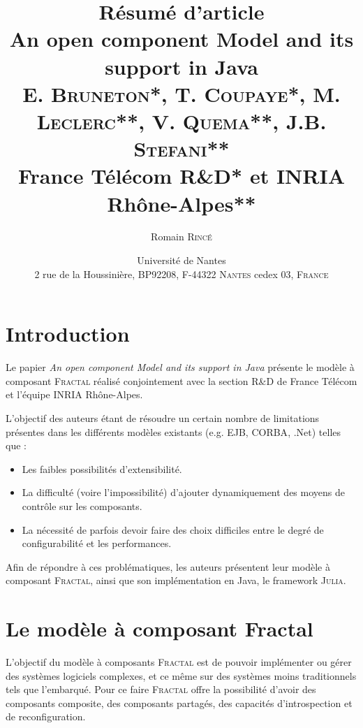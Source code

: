 \documentclass[12pt,a4paper,utf8x]{report}
\title{{\Huge Résumé d'article}\\\vspace{1cm}An open component Model and its support in Java\\\vspace{0.3cm}
\small E. \textsc{Bruneton}*, T. \textsc{Coupaye}*, M. \textsc{Leclerc}**, V. \textsc{Quema}**, J.B. \textsc{Stefani}**\\
France Télécom R\&D* et \textsc{INRIA} Rhône-Alpes**}
\author{Romain \textsc{Rincé}}
\date{Université de Nantes \\ 2 rue de la Houssinière, BP92208, F-44322 \textsc{Nantes} cedex 03, \textsc{France}}
\newcommand{\versalitas}[1]{{\usefont{T1}{cmr}{bx}{sc}#1}}%
\newcommand\fractal{\textsc{Fractal}}
\newcommand\julia{\textsc{Julia}}
\begin{document}
\maketitle
\renewcommand{\labelitemi}{$\bullet$} 

\clearpage

\clearpage

\section{Introduction}
Le papier \og \emph{An open component Model and its support in Java}\fg{} présente le modèle à composant \fractal{} réalisé conjointement avec la section R\&D de France Télécom et l'équipe \textsc{INRIA} Rhône-Alpes. 

L'objectif des auteurs étant de résoudre un certain nombre de limitations présentes dans les différents modèles existants (e.g. \textsc{EJB}, \textsc{CORBA}, .Net) telles que :
\begin{itemize}
 \item Les faibles possibilités d'extensibilité.
 \item La difficulté (voire l'impossibilité) d'ajouter dynamiquement des moyens de contrôle sur les composants.
 \item La nécessité de parfois devoir faire des choix difficiles entre le degré de configurabilité et les performances. 
\end{itemize}
Afin de répondre à ces problématiques, les auteurs présentent leur modèle à composant \fractal, ainsi que son implémentation en Java, le framework \julia.




\section{Le modèle à composant \versalitas{Fractal}}
L'objectif du modèle à composants \fractal{} est de pouvoir implémenter ou gérer des systèmes logiciels complexes, et ce même sur des systèmes moins traditionnels tels que l'embarqué. Pour ce faire \fractal{} offre la possibilité d'avoir des composants composite, des composants partagés,  des capacités d'introspection et de reconfiguration.
\end{document}
